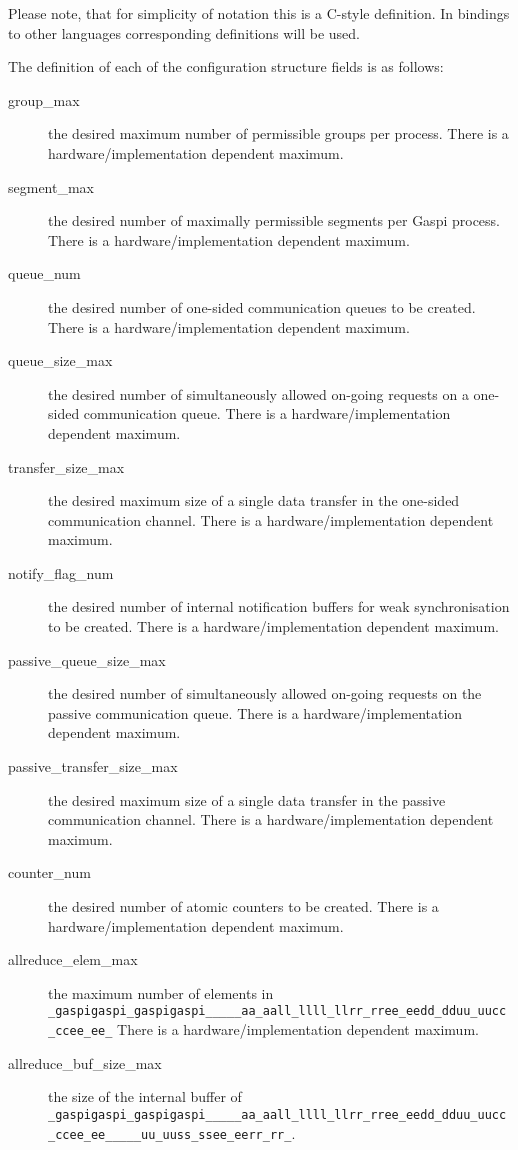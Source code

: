\documentclass[a4paper]{article}
\makeatletter
\newlength{\st}\setlength{\st}{0pt}
\newcommand{\zerowsep}{\hskip 0pt plus 0.1pt minus 0.1pt}
\newcommand{\ZSEP}[1]{\ifx#1\@@@EOZ@@@\let\next\relax\else\ifx#1\_#1\zerowsep\else#1\fi\let\next\ZSEP\fi\next}
\newcommand{\zsep}[1]{\ZSEP{}#1\@@@EOZ@@@}
\newcommand{\gaspiprefix}{gaspi}
\newcommand{\GASPI}{{\sc Gaspi}}
\newcommand{\function}[1]{{\tt #1}}
\newcommand{\gaspifunction}[1]{\function{\protect\zsep{\gaspiprefix\_#1}}}
\newcounter{counttodo}
\newlength{\savetabcolsep}
\newlength{\savearrayrulewidth}
\newenvironment{todo}
{\stepcounter{counttodo}
 \typeout{Environment TODO call \thecounttodo}
 \setlength{\savetabcolsep}{\tabcolsep}
 \setlength{\savearrayrulewidth}{\arrayrulewidth}
 \renewcommand{\tabcolsep}{0pt}
 \renewcommand{\arrayrulewidth}{2pt}
 \begin{center}
 \begin{tabular}{c|l@{\hspace*{2em}}|@{\hspace*{2em}}c}
 &
 \begin{minipage}{0.66\textwidth}
 \begin{itemize}
}
{\end{itemize}
 \end{minipage}
 &  todo \#\thecounttodo
 \end{tabular} \marginpar{$\Longleftarrow$}
 \end{center}
 \renewcommand{\tabcolsep}{\savetabcolsep}
 \renewcommand{\arrayrulewidth}{\savearrayrulewidth}
}
\makeatother
\begin{document}
Please note, that for simplicity of notation this is a C-style
definition. In bindings to other languages corresponding definitions
will be used.


The definition of each of the configuration structure fields is as follows:

\begin{description}
\item[group\_max] the desired maximum number of permissible groups per process. There is a hardware/implementation dependent maximum.
\item[segment\_max] the desired number of maximally permissible segments per \GASPI{} process.
There is a hardware/implementation dependent maximum.
\item[queue\_num] the desired number of one-sided communication queues to be created. There is a hardware/implementation
dependent maximum.
\item[queue\_size\_max] the desired number of simultaneously allowed on-going requests on a one-sided communication queue.
There is a hardware/implementation dependent maximum.
\item[transfer\_size\_max] the desired maximum size of a single data
  transfer in the one-sided communication channel.
There is a hardware/implementation dependent maximum.
\item[notify\_flag\_num] the desired number of internal notification buffers for weak synchronisation to be created.
There is a hardware/implementation dependent maximum.
\item[passive\_queue\_size\_max] the desired number of simultaneously allowed on-going requests on the
passive communication queue. There is a hardware/implementation dependent maximum.
\item[passive\_transfer\_size\_max] the desired maximum size of a
  single data transfer in the passive communication channel.
There is a hardware/implementation dependent maximum.
\item[counter\_num] the desired number of atomic counters to be created.
There is a hardware/implementation dependent maximum.
\item[allreduce\_elem\_max] the maximum number of elements in \gaspifunction{allreduce}
There is a hardware/implementation dependent maximum.
\item[allreduce\_buf\_size\_max] the size of the internal buffer of \gaspifunction{allreduce\_user}.

\end{description}
\end{document}
